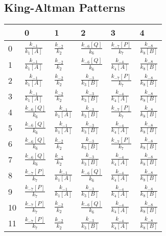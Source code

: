 \documentclass{article}%
\begin{document}
%
\subsection{King{-}Altman Patterns}%
\label{subsec:King{-}Altman Patterns}%
\begin{tabular}{llllll}
\toprule
{} &                          0 &                          1 &                          2 &                          3 &                          4 \\
\midrule
0  &  $\frac{k_{-1}}{k_{1}[A]}$ &     $\frac{k_{-2}}{k_{2}}$ &  $\frac{k_{-6}[Q]}{k_{6}}$ &  $\frac{k_{-7}[P]}{k_{7}}$ &  $\frac{k_{-8}}{k_{8}[B]}$ \\
1  &  $\frac{k_{-1}}{k_{1}[A]}$ &     $\frac{k_{-2}}{k_{2}}$ &  $\frac{k_{-6}[Q]}{k_{6}}$ &  $\frac{k_{-4}}{k_{4}[A]}$ &  $\frac{k_{-8}}{k_{8}[B]}$ \\
2  &  $\frac{k_{-1}}{k_{1}[A]}$ &     $\frac{k_{-2}}{k_{2}}$ &  $\frac{k_{-3}}{k_{3}[B]}$ &  $\frac{k_{-7}[P]}{k_{7}}$ &  $\frac{k_{-8}}{k_{8}[B]}$ \\
3  &  $\frac{k_{-1}}{k_{1}[A]}$ &     $\frac{k_{-2}}{k_{2}}$ &  $\frac{k_{-3}}{k_{3}[B]}$ &  $\frac{k_{-4}}{k_{4}[A]}$ &  $\frac{k_{-8}}{k_{8}[B]}$ \\
4  &  $\frac{k_{-6}[Q]}{k_{6}}$ &  $\frac{k_{-1}}{k_{1}[A]}$ &  $\frac{k_{-3}}{k_{3}[B]}$ &  $\frac{k_{-7}[P]}{k_{7}}$ &  $\frac{k_{-8}}{k_{8}[B]}$ \\
5  &  $\frac{k_{-6}[Q]}{k_{6}}$ &  $\frac{k_{-1}}{k_{1}[A]}$ &  $\frac{k_{-3}}{k_{3}[B]}$ &  $\frac{k_{-4}}{k_{4}[A]}$ &  $\frac{k_{-8}}{k_{8}[B]}$ \\
6  &  $\frac{k_{-6}[Q]}{k_{6}}$ &     $\frac{k_{-2}}{k_{2}}$ &  $\frac{k_{-3}}{k_{3}[B]}$ &  $\frac{k_{-7}[P]}{k_{7}}$ &  $\frac{k_{-8}}{k_{8}[B]}$ \\
7  &  $\frac{k_{-6}[Q]}{k_{6}}$ &     $\frac{k_{-2}}{k_{2}}$ &  $\frac{k_{-3}}{k_{3}[B]}$ &  $\frac{k_{-4}}{k_{4}[A]}$ &  $\frac{k_{-8}}{k_{8}[B]}$ \\
8  &  $\frac{k_{-7}[P]}{k_{7}}$ &  $\frac{k_{-1}}{k_{1}[A]}$ &  $\frac{k_{-6}[Q]}{k_{6}}$ &  $\frac{k_{-4}}{k_{4}[A]}$ &  $\frac{k_{-8}}{k_{8}[B]}$ \\
9  &  $\frac{k_{-7}[P]}{k_{7}}$ &  $\frac{k_{-1}}{k_{1}[A]}$ &  $\frac{k_{-3}}{k_{3}[B]}$ &  $\frac{k_{-4}}{k_{4}[A]}$ &  $\frac{k_{-8}}{k_{8}[B]}$ \\
10 &  $\frac{k_{-7}[P]}{k_{7}}$ &     $\frac{k_{-2}}{k_{2}}$ &  $\frac{k_{-6}[Q]}{k_{6}}$ &  $\frac{k_{-4}}{k_{4}[A]}$ &  $\frac{k_{-8}}{k_{8}[B]}$ \\
11 &  $\frac{k_{-7}[P]}{k_{7}}$ &     $\frac{k_{-2}}{k_{2}}$ &  $\frac{k_{-3}}{k_{3}[B]}$ &  $\frac{k_{-4}}{k_{4}[A]}$ &  $\frac{k_{-8}}{k_{8}[B]}$ \\
\bottomrule
\end{tabular}
\end{document}
